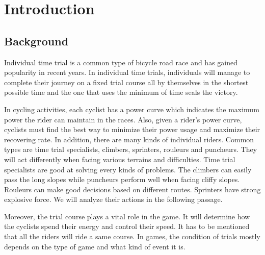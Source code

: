 \documentclass{article}
\begin{document}

    \clearpage
    \newpage
    \pagestyle{empty}
    \setlength{\headheight}{12pt}
    \renewcommand{\headrulewidth}{0.5pt}
    \renewcommand{\footrulewidth}{0.0pt}
    \pagestyle{fancy}
    \cfoot{}
    \lfoot{}
    \rfoot{}

    \clearpage
    \thispagestyle{empty}
    \tableofcontents
    \newpage
    \pagestyle{fancy}
    \setcounter{page}{1}

	\newpage
	\section{Introduction}
		\subsection{Background}
		Individual time trial is a common type of bicycle road race and has gained popularity in recent years. In individual time trials, individuals will manage to complete their journey on a fixed trial course all by themselves in the shortest possible time and the one that uses the minimum of time seals the victory.

		In cycling activities, each cyclist has a power curve which indicates the maximum power the rider can maintain in the races. Also, given a rider's power curve, cyclists must find the best way to minimize their power usage and maximize their recovering rate. In addition, there are many kinds of individual riders. Common types are time trial specialists, climbers, sprinters, rouleurs and puncheurs. They will act differently when facing various terrains and difficulties. Time trial specialists are good at solving every kinds of problems. The climbers can easily pass the long slopes while puncheurs perform well when facing cliffy slopes. Rouleurs can make good decisions based on different routes. Sprinters have strong explosive force. We will analyze their actions in the following passage.

		Moreover, the trial course plays a vital role in the game. It will determine how the cyclists spend their energy and control their speed. It has to be mentioned that all the riders will ride a same course. In games, the condition of trials mostly depends on the type of game and what kind of event it is.
\end{document}
